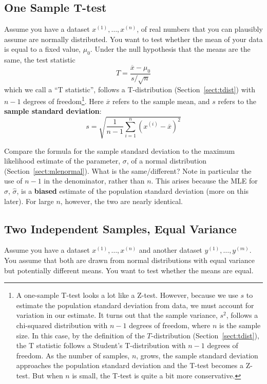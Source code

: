 \subsection{One Sample T-test}

Assume you have a dataset $x^{(1)}, \dots, x^{(n)}$, of real numbers that you can plausibly assume are normally distributed. You want to test whether the mean of your data is equal to a fixed value, $\mu_0$. Under the null hypothesis that the means are the same, the test statistic
$$ T = \frac{\overline{x} - \mu_0}{s/\sqrt{n}} $$
which we call a ``T statistic'', follows a T-distribution (Section~\ref{sect:tdist}) with $n-1$ degrees of freedom\footnote{A one-sample T-test looks a lot like a Z-test. However, because we use $s$ to estimate the population standard deviation from data, we must account for variation in our estimate. It turns out that the sample variance, $s^2$, follows a chi-squared distribution with $n-1$ degrees of freedom, where $n$ is the sample size. In this case, by the definition of the $T$-distribution (Section~\ref{sect:tdist}), the T statistic follows a Student's T-distribution with $n-1$ degrees of freedom. As the number of samples, $n$, grows, the sample standard deviation approaches the population standard deviation and the T-test becomes a Z-test. But when $n$ is small, the T-test is quite a bit more conservative.}. Here $\overline{x}$ refers to the sample mean, and $s$ refers to the \textbf{sample standard deviation}:
$$ s = \sqrt{\frac{1}{n-1} \sum_{i=1}^n (x^{(i)} - \overline{x})^2} $$

\begin{question}{}
Compare the formula for the sample standard deviation to the maximum likelihood estimate of the parameter, $\sigma$, of a normal distribution (Section~\ref{sect:mlenormal}). What is the same/different? Note in particular the use of $n-1$ in the denominator, rather than $n$. This arises because the MLE for $\sigma$, $\hat{\sigma}$, is a \textbf{biased} estimate of the population standard deviation (more on this later). For large $n$, however, the two are nearly identical. 
\end{question}

\subsection{Two Independent Samples, Equal Variance}

Assume you have a dataset $x^{(1)}, \dots, x^{(n)}$ and another dataset $y^{(1)}, \dots, y^{(m)}$. You assume that both are drawn from normal distributions with equal variance but potentially different means. You want to test whether the means are equal. 

